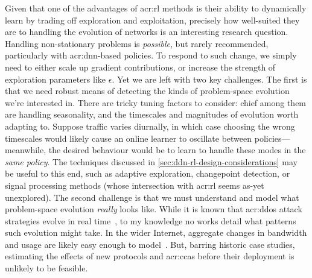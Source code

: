 

Given that one of the advantages of \gls{acr:rl} methods is their ability to dynamically learn by trading off exploration and exploitation, precisely how well-suited they are to handling the evolution of networks is an interesting research question.
Handling non-stationary problems is \emph{possible}, but rarely recommended, particularly with \gls{acr:dnn}-based policies.
To respond to such change, we simply need to either scale up gradient contributions, or increase the strength of exploration parameters like $\epsilon$.
Yet we are left with two key challenges.
The first is that we need robust means of detecting the kinds of problem-space evolution we're interested in.
There are tricky tuning factors to consider: chief among them are handling seasonality, and the timescales and magnitudes of evolution worth adapting to.
Suppose traffic varies diurnally, in which case choosing the wrong timescales would likely cause an online learner to oscillate between policies---meanwhile, the desired behaviour would be to learn to handle these modes in the \emph{same policy}.
The techniques discussed in \cref{sec:ddn-rl-design-considerations} may be useful to this end, such as adaptive exploration, changepoint detection, or signal processing methods (whose intersection with \gls{acr:rl} seems as-yet unexplored).
The second challenge is that we must understand and model what problem-space evolution \emph{really} looks like.
While it is known that \gls{acr:ddos} attack strategies evolve in real time~\parencite{DBLP:conf/spw/KangGS16}, to my knowledge no works detail what patterns such evolution might take.
In the wider Internet, aggregate changes in bandwidth and usage are likely easy enough to model~\parencite{DBLP:conf/anrw/BauerJHBC21}.
But, barring historic case studies, estimating the effects of new protocols and \glspl{acr:cca} before their deployment is unlikely to be feasible.

